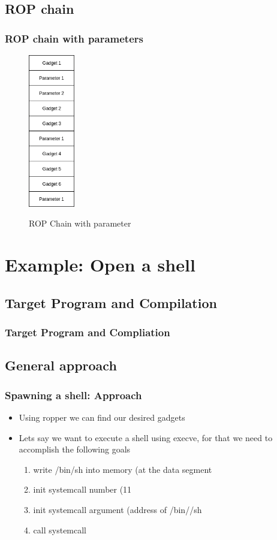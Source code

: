 \documentclass[11pt]{beamer}
\begin{document}
\subsection{ROP chain}
\begin{frame}
    \frametitle{ROP chain with parameters}
    \begin{figure}[h]
        \caption{ROP Chain with parameter}
        \centering
        \includegraphics[width=0.18\textwidth]{./img/gadgetstack.png}\label{gadget2}
    \end{figure}
\end{frame}

\section{Example: Open a shell}
\subsection{Target Program and Compilation}
\begin{frame}[fragile]
    \frametitle{Target Program and Compliation}
\end{frame}
\subsection{General approach}
\begin{frame}[fragile]
    \frametitle{Spawning a shell: Approach}
    \begin{itemize}
        \item Using ropper we can find our desired gadgets
        \item Lets say we want to execute a shell using execve, for that we need to accomplish the following goals
        \begin{enumerate}
            \item write /bin/sh into memory (at the data segment\)\)
            \item init systemcall number (11\)\)
            \item init systemcall argument (address of /bin//sh\)\)
            \item call systemcall
        \end{enumerate}
    \end{itemize}
\end{frame}
\end{document}
